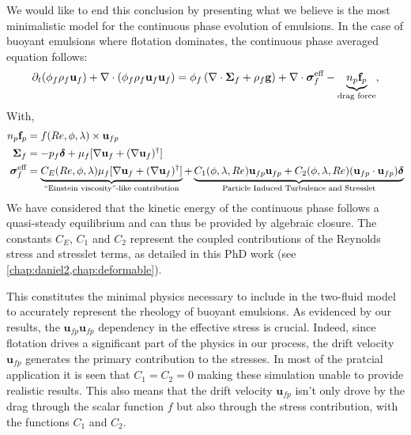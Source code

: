 We would like to end this conclusion by presenting what we believe is the most minimalistic model for the continuous phase evolution of emulsions.
In the case of buoyant emulsions where flotation dominates, the continuous phase averaged equation follows: 
\begin{align}
    \partial_t (\phi_f\rho_f \textbf{u}_f)
    + \mathbf{\nabla}\cdot (\phi_f\rho_f \textbf{u}_f\textbf{u}_f)
    = \phi_f 
    \left(\mathbf{\nabla}\cdot \bm{\Sigma}_f
    + \rho_f \textbf{g}\right)
    + \mathbf{\nabla}\cdot  \bm{\sigma}_f^{\text{eff}}
    - \underbrace{n_p \textbf{f}_p}_\text{drag force},
\end{align}
With, 
\begin{align}
    n_p \textbf{f}_p  
    &= 
    f(Re,\phi, \lambda) \times \textbf{u}_{fp}\\
  \bm\Sigma_f &= - p_f \bm\delta + \mu_f [\mathbf{\nabla} \textbf{u}_f +  (\mathbf{\nabla} \textbf{u}_f)^\dagger ] \\
    \bm{\sigma}^{\text{eff}}_f 
    &= \underbrace{C_E(Re,\phi,\lambda) \mu_f [\mathbf{\nabla} \textbf{u}_f +  (\mathbf{\nabla} \textbf{u}_f)^\dagger ] }_\text{``Einstein viscosity''-like contribution}
    + 
    \underbrace{
      C_1(\phi,\lambda,Re)\textbf{u}_{fp}\textbf{u}_{fp}
    + C_2(\phi,\lambda,Re)(\textbf{u}_{fp}\cdot \textbf{u}_{fp})     \bm\delta}_\text{Particle Induced Turbulence and Stresslet}
\end{align}
We have considered that the kinetic energy of the continuous phase follows a quasi-steady equilibrium and can thus be provided by algebraic closure.
The constants $C_E$, $C_1$ and $C_2$ represent the coupled contributions of the Reynolds stress and stresslet terms, as detailed in this PhD work (see \ref{chap:daniel2,chap:deformable}).

This constitutes the minimal physics necessary to include in the two-fluid model to accurately represent the rheology of buoyant emulsions.
As evidenced by our results, the $\textbf{u}_{fp}\textbf{u}_{fp}$ dependency in the effective stress is crucial.
Indeed, since flotation drives a significant part of the physics in our process, the drift velocity $\textbf{u}_{fp}$ generates the primary contribution to the stresses.
In most of the pratcial application it is seen that $C_1 = C_2 = 0$ making these simulation unable to provide realistic results.
This also means that the drift velocity $\textbf{u}_{fp}$ isn't only drove by the drag through the scalar function $f$ but also through the stress contribution, with the functions $C_1$ and $C_2$.


